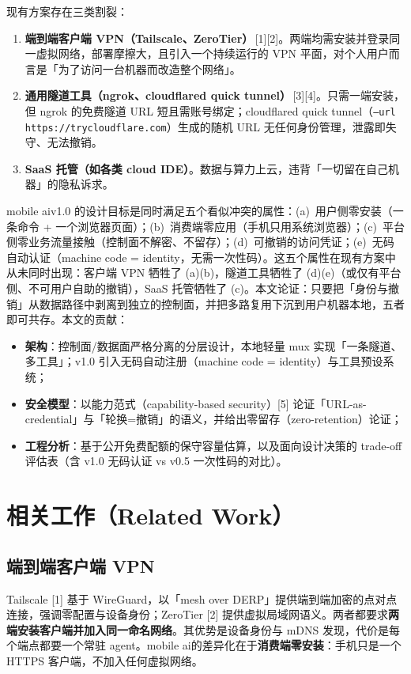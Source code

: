\documentclass[10pt,a4paper]{article}
\newcommand{\sys}{mobile ai}
\begin{document}
现有方案存在三类割裂：
\begin{enumerate}[leftmargin=1.6em,itemsep=0.2em,topsep=0.2em]
  \item \textbf{端到端客户端 VPN（Tailscale、ZeroTier）}\,[1][2]。两端均需安装并登录同一虚拟网络，部署摩擦大，且引入一个持续运行的 VPN 平面，对个人用户而言是「为了访问一台机器而改造整个网络」。
  \item \textbf{通用隧道工具（ngrok、cloudflared quick tunnel）}\,[3][4]。只需一端安装，但 ngrok 的免费隧道 URL 短且需账号绑定；cloudflared quick tunnel（\texttt{--url https://trycloudflare.com}）生成的随机 URL 无任何身份管理，泄露即失守、无法撤销。
  \item \textbf{SaaS 托管（如各类 cloud IDE）}。数据与算力上云，违背「一切留在自己机器」的隐私诉求。
\end{enumerate}

\sys v1.0 的设计目标是同时满足五个看似冲突的属性：(a)~用户侧零安装（一条命令 + 一个浏览器页面）；(b)~消费端零应用（手机只用系统浏览器）；(c)~平台侧零业务流量接触（控制面不解密、不留存）；(d)~可撤销的访问凭证；(e)~无码自动认证（machine code = identity，无需一次性码）。这五个属性在现有方案中从未同时出现：客户端 VPN 牺牲了 (a)(b)，隧道工具牺牲了 (d)(e)（或仅有平台侧、不可用户自助的撤销），SaaS 托管牺牲了 (c)。本文论证：只要把「身份与撤销」从数据路径中剥离到独立的控制面，并把多路复用下沉到用户机器本地，五者即可共存。本文的贡献：
\begin{itemize}[leftmargin=1.6em,itemsep=0.2em,topsep=0.2em]
  \item \textbf{架构}：控制面/数据面严格分离的分层设计，本地轻量 mux 实现「一条隧道、多工具」；v1.0 引入无码自动注册（machine code = identity）与工具预设系统；
  \item \textbf{安全模型}：以能力范式（capability-based security）[5] 论证「URL-as-credential」与「轮换=撤销」的语义，并给出零留存（zero-retention）论证；
  \item \textbf{工程分析}：基于公开免费配额的保守容量估算，以及面向设计决策的 trade-off 评估表（含 v1.0 无码认证 vs v0.5 一次性码的对比）。
\end{itemize}

\section{相关工作（Related Work）}

\subsection{端到端客户端 VPN}
Tailscale [1] 基于 WireGuard，以「mesh over DERP」提供端到端加密的点对点连接，强调零配置与设备身份；ZeroTier [2] 提供虚拟局域网语义。两者都要求\textbf{两端安装客户端并加入同一命名网络}。其优势是设备身份与 mDNS 发现，代价是每个端点都要一个常驻 agent。\sys 的差异化在于\textbf{消费端零安装}：手机只是一个 HTTPS 客户端，不加入任何虚拟网络。
\end{document}
